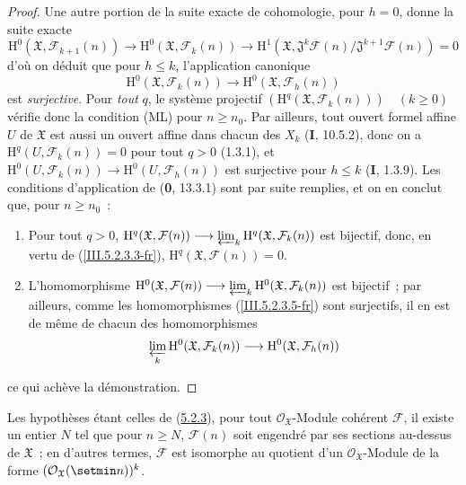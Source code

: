 \begin{proof}
Une autre portion de la suite exacte de cohomologie, pour $h=0$, donne la suite
exacte
\begin{equation}
\mathrm H^0(\mathfrak X,\mathcal F_{k+1}(n))\to
\mathrm H^0(\mathfrak X,\mathcal F_k(n))\to
\mathrm H^1(\mathfrak X,
\mathfrak J^k\mathcal F(n)/\mathfrak J^{k+1}\mathcal F(n))=0
\tag{5.2.3.4}
\label{III.5.2.3.4-fr}
\end{equation}
d'où on déduit que pour $h\leq k$, l'application canonique
\begin{equation}
\mathrm H^0(\mathfrak X,\mathcal F_k(n))\longrightarrow
\mathrm H^0(\mathfrak X,\mathcal F_h(n))
\tag{5.2.3.5}
\label{III.5.2.3.5-fr}
\end{equation}
est \emph{surjective}. Pour \emph{tout} $q$, le système projectif
$(\mathrm H^q(\mathfrak X,\mathcal F_k(n)))\quad(k\geq0)$ vérifie donc la condition
(ML) pour $n\geq n_0$. Par ailleurs, tout ouvert formel affine $U$ de $\mathfrak X$
est aussi un ouvert affine dans chacun des $X_k$ (\textbf{I}, 10.5.2), donc on a
$\mathrm H^q(U,\mathcal F_k(n))=0$ pour tout $q>0$ (1.3.1), et
$\mathrm H^0(U,\mathcal F_k(n))\to\mathrm H^0(U,\mathcal F_h(n))$ est surjective
pour $h\leq k$ (\textbf{I}, 1.3.9). Les conditions d'application de (\textbf{0}, 13.3.1) sont par
suite remplies, et on en conclut que, pour $n\geq n_0$~:
\begin{enumerate}
\item[$1^\circ$] Pour tout $q>0$,
$\mathrm H^q(\mathfrak X,\mathcal F(n))\longrightarrow
\varprojlim_k\mathrm H^q(\mathfrak X,\mathcal F_k(n))$
est bijectif, donc, en vertu de (\ref{III.5.2.3.3-fr}),
$\mathrm H^q(\mathfrak X,\mathcal F(n))=0$.
\item[$2^\circ$] L'homomorphisme
$\mathrm H^0(\mathfrak X,\mathcal F(n))\longrightarrow
\varprojlim_k\mathrm H^0(\mathfrak X,\mathcal F_k(n))$
est bijectif~; par ailleurs, comme les homomorphismes
(\ref{III.5.2.3.5-fr}) sont surjectifs, il en est de même de chacun des
homomorphismes
\[
\varprojlim_k\mathrm H^0(\mathfrak X,\mathcal F_k(n))
\longrightarrow\mathrm H^0(\mathfrak X,\mathcal F_h(n))
\]
\end{enumerate}
ce qui achève la démonstration.
\end{proof}

\begin{corollary}[5.2.4]
\label{III.5.2.4-fr}
Les hypothèses étant celles de \textup{(\hyperref[III.5.2.3-fr]{5.2.3})}, pour tout
$\mathcal O_{\mathfrak X}$-Module cohérent $\mathcal F$, il existe un entier $N$
tel que pour $n\geq N$, $\mathcal F(n)$ soit engendré par ses sections au-dessus
de $\mathfrak X$~; en d'autres termes, $\mathcal F$ est isomorphe au quotient d'un
$\mathcal O_{\mathfrak X}$-Module de la forme
$(\mathcal O_{\mathfrak X}(\setmin n))^k$.
\end{corollary}

